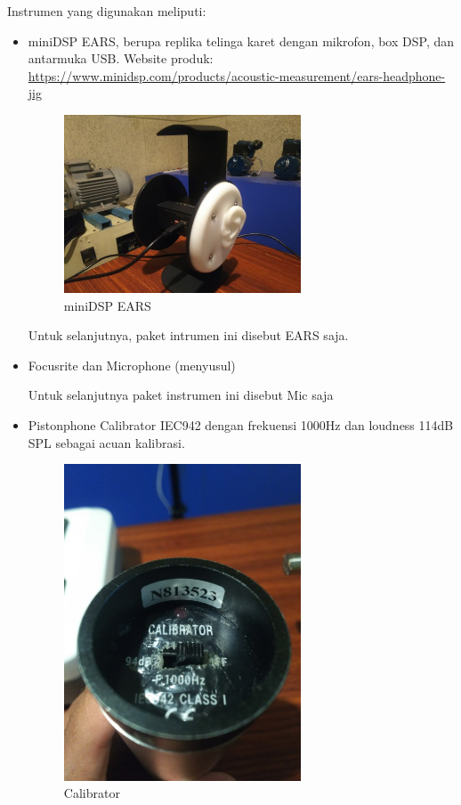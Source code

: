 \documentclass[12pt,]{article}
\begin{document}
	Instrumen yang digunakan meliputi:
	\begin{itemize}
		\item miniDSP EARS, berupa replika telinga karet dengan mikrofon, box DSP, dan antarmuka USB.
		Website produk:\\
		\url{https://www.minidsp.com/products/acoustic-measurement/ears-headphone-jig}
		
		\begin{figure}[!ht]
			\centering
			\includegraphics[width=200pt]{images/ears}
			\caption{miniDSP EARS}
		\end{figure}
	
		Untuk selanjutnya, paket intrumen ini disebut EARS saja.
		
		\item Focusrite dan Microphone (menyusul)
		
		Untuk selanjutnya paket instrumen ini disebut Mic saja
		
		\item Pistonphone Calibrator IEC942 dengan frekuensi 1000Hz dan loudness 114dB SPL sebagai acuan kalibrasi.
		\begin{figure}[!ht]
			\centering
			\includegraphics[width=200pt]{images/calibrator}
			\caption{Calibrator}
		\end{figure}	
\end{itemize} 
	
\end{document}
